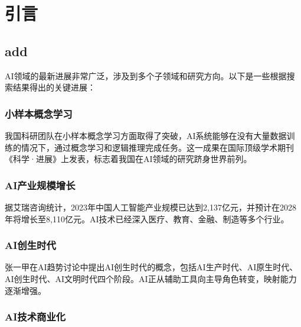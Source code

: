 \chapter{引言}\label{chap:Firse}

\section{add}

AI领域\cite{1022526865.nh}的最新进展\cite{1022776046.nh}非常广泛，涉及到多个子领域\cite{1022802292.nh}和研究方向\cite{1023026619.nh}。以下\cite{1023026619.nh}是一些根据搜索\cite{1023126184.nh}结果得出的关键进展\cite{1023074826.nh}：

\subsection{小样本概念学习\cite{1023473037.nh} }

我国科研团队\cite{1023532465.nh}在小样本概念学习\cite{1023532487.nh}方面取得了突破\cite{1023736935.nh}，AI系统\cite{1023742110.nh}能够在没有大量数据训练\cite{1023842249.nh}的情况下，通过概念学习\cite{1023854471.nh}和逻辑推理\cite{1023901740.nh}完成任务。这一成果\cite{1024000941.nh}在国际顶级学术期刊《科学·进展》上发表\cite{1024350451.nh}，标志着我国在AI领域的研究跻身世界前列\cite{1024351780.nh}。

\subsection{AI产业规模增长\cite{1024364355.nh}} 

据艾瑞咨询统计\cite{1024366234.nh}，2023年中国人工智能产业规模\cite{AGLU202211003115}已达到2,137亿元，并预计在2028年将增长至8,110亿元\cite{DQXX202307004}。AI技术\cite{JSJG202302008}已经深入医疗、教育、金融、制造等多个行业\cite{JSWL202401014}。

\subsection{AI创生时代\cite{KXSY202202006} }

张一甲在AI趋势讨论\cite{KZLY2023092701I}中提出AI创生时代\cite{LXJZ202302005}的概念，包括AI生产时代\cite{LXXB202305014}、AI原生时代、AI创生时代、AI文明时代四个阶段\cite{LXXB202305014}。AI正从辅助工具向主导角色转变\cite{QDHY202402015}，映射能力逐渐增强。

\subsection{AI技术商业化\cite{RN1} }

